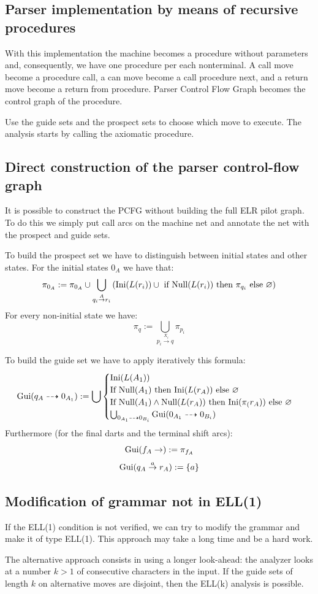 \subsection*{Parser implementation by means of recursive procedures}
With this implementation the machine becomes a procedure without parameters and, consequently, we have  one procedure per each nonterminal. 
A call move become a procedure call, a can move become a call procedure next, and a return move become a return from procedure. 
Parser Control Flow Graph becomes the control graph of the procedure. 

Use the guide sets and the prospect sets to choose which move to execute. 
The analysis starts by calling the axiomatic procedure. 

\subsection*{Direct construction of the parser control-flow graph}
It is possible to construct the PCFG without building the full ELR pilot graph. 
To do this we simply put call arcs on the machine net and annotate the net with the prospect and guide sets. 

To build the prospect set we have to distinguish between initial states and other states. 
For the initial states $0_A$ we have that: 
\[\pi_{0_A}:=\pi_{0_A} \cup \bigcup_{q_i \overset{A}{\rightarrow} r_i}\left( \textnormal{Ini}(L(r_i)) \cup \textnormal{ if Null}(L(r_i)) \textnormal{ then } \pi_{q_i} \textnormal{ else } \varnothing \right)\]
For every non-initial state we have: 
\[\pi_q:=\bigcup_{p_i \overset{X_i}{\rightarrow}q}\pi_{p_i}\]

To build the guide set we have to apply iteratively this formula: 
\[\textnormal{Gui}(q_A \dashrightarrow 0_{A_1}):=\bigcup
\begin{cases}
    \textnormal{Ini}(L(A_1)) \\
    \textnormal{If Null}(A_1) \textnormal{ then Ini}(L(r_A)) \textnormal{ else } \varnothing \\
    \textnormal{If Null}(A_1) \land \textnormal{Null}(L(r_A)) \textnormal{ then Ini}(\pi_(r_A)) \textnormal{ else } \varnothing \\
    \bigcup_{0_{A_1} \dashrightarrow 0_{B_i}}\textnormal{Gui}(0_{A_1} \dashrightarrow 0_{B_i})
\end{cases}\]
Furthermore (for the final darts and the terminal shift arcs): 
\[\textnormal{Gui}(f_A \rightarrow):=\pi_{f_A}\]
\[\textnormal{Gui}(q_A \overset{a}{\rightarrow}r_A):=\{a\}\]

\subsection*{Modification of grammar not in ELL(1)}
If the ELL(1) condition is not verified, we can try to modify the grammar and make it of type ELL(1).
This approach may take a long time and be a hard work. 

The alternative approach consists in using a longer look-ahead: the analyzer looks at a number $k >1$ of consecutive characters in the input. 
If the guide sets of length $k$ on alternative moves are disjoint, then the ELL(k) analysis is possible.